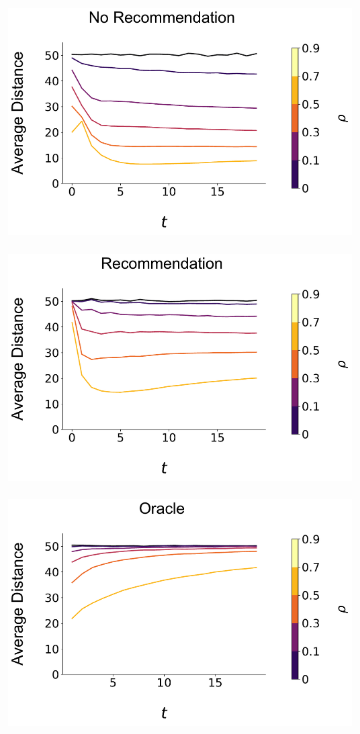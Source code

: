\documentclass[sigconf]{acmart}
\begin{document}
 

\begin{figure}[t]
\centering
\begin{subfigure}{.25\linewidth}
\includegraphics[width=\linewidth]{figures/rho_consumption_dist_N_200T_20.pdf}
\end{subfigure}
\begin{subfigure}{.25\linewidth}
\includegraphics[width=\linewidth]{figures/rho_consumption_dist_N_200T_20_partial.pdf}
\end{subfigure}
\begin{subfigure}{.25\linewidth}
\includegraphics[width=\linewidth]{figures/rho_consumption_dist_N_200T_20_omni.pdf}

\end{subfigure}
\end{figure}
\end{document}
